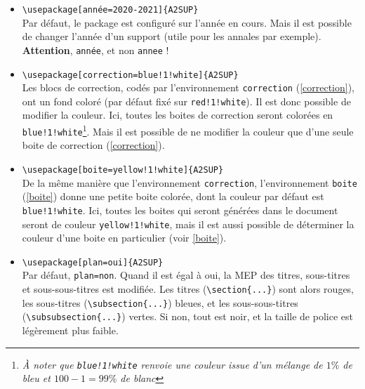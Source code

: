 \documentclass[a4paper,11pt]{article}
\begin{document}
\begin{itemize}
    \item \verb|\usepackage[année=2020-2021]{A2SUP}|\\
        Par défaut, le package est configuré sur l'année en cours. Mais il est possible de changer l'année d'un support (utile pour les annales par exemple). \textbf{Attention}, \verb|année|, et non \verb|annee| !
    \item \verb|\usepackage[correction=blue!1!white]{A2SUP}|\\
        Les blocs de correction, codés par l'environnement \texttt{correction} (\ref{correction}), ont un fond coloré (par défaut fixé sur \texttt{red!1!white}). Il est donc possible de modifier la couleur. Ici, toutes les boites de correction seront colorées en \texttt{blue!1!white}\footnote{\textsl{À noter que \texttt{blue!1!white} renvoie une couleur issue d'un mélange de $1\%$ de bleu et $100-1=99\%$ de blanc}}. Mais il est possible de ne modifier la couleur que d'une seule boite de correction (\ref{correction}).
    \item \verb|\usepackage[boite=yellow!1!white]{A2SUP}|\\
        De la même manière que l'environnement \texttt{correction}, l'environnement \texttt{boite} (\ref{boite}) donne une petite boite colorée, dont la couleur par défaut est \texttt{blue!1!white}. Ici, toutes les boites qui seront générées dans le document seront de couleur \texttt{yellow!1!white}, mais il est aussi possible de déterminer la couleur d'une boite en particulier (voir \ref{boite}).
    \item \verb|\usepackage[plan=oui]{A2SUP}|\\
        Par défaut, \texttt{plan=non}. Quand il est égal à oui, la MEP des titres, sous-titres et sous-sous-titres est modifiée. Les titres (\verb|\section{...}|) sont alors rouges, les sous-titres (\verb|\subsection{...}|) bleues, et les sous-sous-titres (\verb|\subsubsection{...}|) vertes. Si non, tout est noir, et la taille de police est légèrement plus faible.
\end{itemize}
\end{document}
